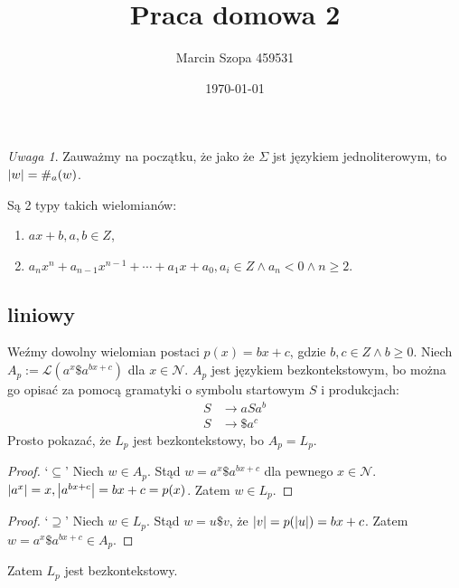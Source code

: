 \documentclass{article}
\title{Praca domowa 2}
\author{Marcin Szopa 459531}
\date{\today}
\theoremstyle{definition}
\theoremstyle{remark}
\newtheorem*{remark}{Uwaga}
\begin{document}
\maketitle

\section{}\label{sec:a}

\begin{remark}
    Zauważmy na początku, że jako że \(\Sigma\) jst językiem jednoliterowym, to
    \(\abs{w} = \#_a(w)\).
\end{remark}

Są 2 typy takich wielomianów:

\begin{enumerate}
    \item \(ax + b, a,b \in Z\),
    \item \(a_nx^n + a_{n-1}x^{n-1} + \cdots + a_1x + a_0, a_i \in Z \land a_n < 0 \land n \geq 2\).
\end{enumerate}

\subsection{liniowy}

Weźmy dowolny wielomian postaci \( p(x)=bx + c\), gdzie \(b,c \in Z \land b \geq 0\). 
Niech \(A_p := \mathcal{L}(a^x \$ a^{bx + c})\) dla \(x \in \mathcal{N}\).
\(A_p\) jest językiem bezkontekstowym, bo można go opisać za pomocą gramatyki
o symbolu startowym \(S\) i produkcjach:
\begin{align*}
    S &\to a S a^b  \\
    S &\to \$ a^c
\end{align*}
Prosto pokazać, że \(L_p\) jest bezkontekstowy, bo \(A_p = L_p\).

\begin{proof}
    `\(\subseteq\)'
    Niech \(w \in A_p\). Stąd \(w = a^x \$ a^{bx + c}\) dla pewnego \(x \in \mathcal{N}\).
    \( \abs{a^x}=x, \abs{a^{bx + c}}=bx + c = p(x)\). Zatem \(w \in L_p\).
\end{proof}

\begin{proof}
    `\(\supseteq\)'
    Niech \(w \in L_p\). Stąd \(w = u \$ v\), że \( \abs{v} = p(\abs{u})
    = bx+c\). Zatem \(w = a^x \$ a^{bx + c} \in A_p\).
\end{proof}

Zatem \(L_p\) jest bezkontekstowy.
\end{document}
